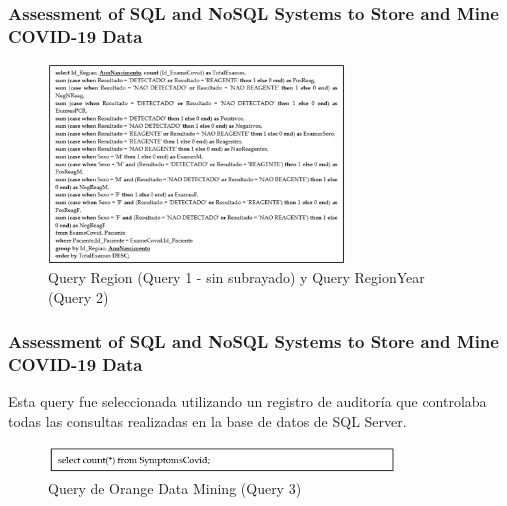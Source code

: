 \begin{frame}
    \frametitle{Assessment of SQL and NoSQL Systems to Store and Mine COVID-19 Data}

    \begin{figure}[H]
        \begin{center}
            \includegraphics[width=0.7\textwidth]{images/cov19-query12.png}
            \caption{Query Region (Query 1 - sin subrayado) y Query RegionYear (Query 2)}
            \label{cov19-q12}
        \end{center}
    \end{figure}
\end{frame}

\begin{frame}
    \frametitle{Assessment of SQL and NoSQL Systems to Store and Mine COVID-19 Data}

    Esta query fue seleccionada utilizando un registro de auditoría que controlaba todas las consultas realizadas en la base de datos de SQL Server.
    
    \begin{figure}[H]
        \begin{center}
            \includegraphics[width=0.82\textwidth]{images/cov19-query3.png}
            \caption{Query de Orange Data Mining (Query 3)}
            \label{cov19-q3}
        \end{center}
    \end{figure}
\end{frame}

